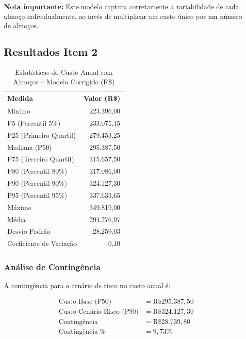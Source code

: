 \documentclass[12pt,a4paper]{article}
\begin{document}
\textbf{Nota importante:} Este modelo captura corretamente a variabilidade de cada almoço individualmente, ao invés de multiplicar um custo único por um número de almoços.

\subsection{Resultados Item 2}

\begin{table}[H]
\centering
\caption{Estatísticas do Custo Anual com Almoços -- Modelo Corrigido (R\$)}
\label{tab:custo_almocos}
\begin{tabular}{lr}
\toprule
\textbf{Medida} & \textbf{Valor (R\$)} \\
\midrule
Mínimo & 223.396,00 \\
P5 (Percentil 5\%) & 233.075,15 \\
P25 (Primeiro Quartil) & 279.453,25 \\
Mediana (P50) & 295.387,50 \\
P75 (Terceiro Quartil) & 315.657,50 \\
P80 (Percentil 80\%) & 317.086,00 \\
P90 (Percentil 90\%) & 324.127,30 \\
P95 (Percentil 95\%) & 337.633,65 \\
Máximo & 349.819,00 \\
\midrule
Média & 294.276,97 \\
Desvio Padrão & 28.259,03 \\
Coeficiente de Variação & 0,10 \\
\bottomrule
\end{tabular}
\end{table}

\subsubsection{Análise de Contingência}

A contingência para o cenário de risco no custo anual é:

\begin{align*}
\text{Custo Base (P50)} &= \text{R\$ } 295.387,50 \\
\text{Custo Cenário Risco (P90)} &= \text{R\$ } 324.127,30 \\
\text{Contingência} &= \text{R\$ } 28.739,80 \\
\text{Contingência \%} &= 9,73\%
\end{align*}
\end{document}
